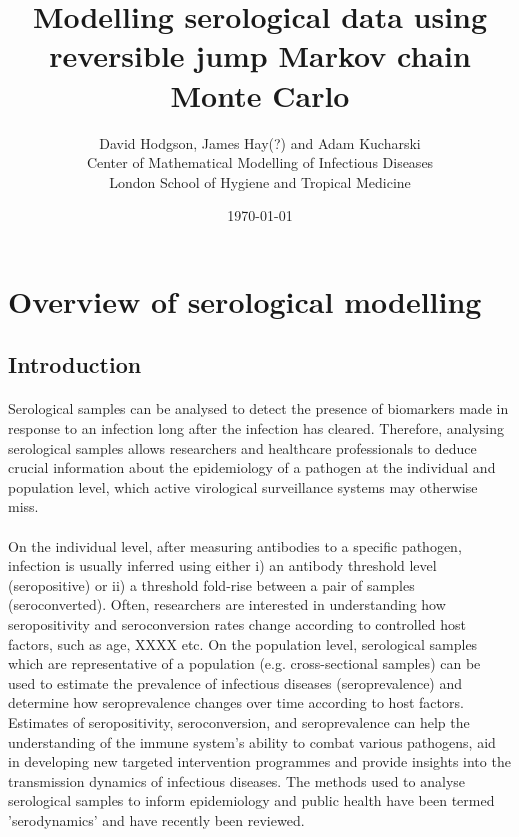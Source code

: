 \documentclass{article}
\title{Modelling serological data using reversible jump Markov chain Monte Carlo}
\author{David Hodgson, James Hay(?) and Adam Kucharski\\\small Center of Mathematical Modelling of Infectious Diseases\\\small London School of Hygiene and Tropical Medicine}
\date{\today}
\begin{document}
\maketitle

\section{Overview of serological modelling}

\subsection{Introduction}

\paragraph{}Serological samples can be analysed to detect the presence of biomarkers made in response to an infection long after the infection has cleared.\cite{Cutts2016} Therefore, analysing serological samples allows researchers and healthcare professionals to deduce crucial information about the epidemiology of a pathogen at the individual and population level, which active virological surveillance systems may otherwise miss.

\paragraph{}On the individual level, after measuring antibodies to a specific pathogen, infection is usually inferred using either i) an antibody threshold level (seropositive) or ii) a threshold fold-rise between a pair of samples (seroconverted).\cite{Haselbeck2022} Often, researchers are interested in understanding how seropositivity and seroconversion rates change according to controlled host factors, such as age, XXXX etc.\cite{} On the population level, serological samples which are representative of a population (e.g. cross-sectional samples) can be used to estimate the prevalence of infectious diseases (seroprevalence) and determine how seroprevalence changes over time according to host factors.\cite{} Estimates of seropositivity, seroconversion, and seroprevalence can help the understanding of the immune system's ability to combat various pathogens, aid in developing new targeted intervention programmes and provide insights into the transmission dynamics of infectious diseases. The methods used to analyse serological samples to inform epidemiology and public health have been termed 'serodynamics' and have recently been reviewed. \cite{Hay2023}
\end{document}
